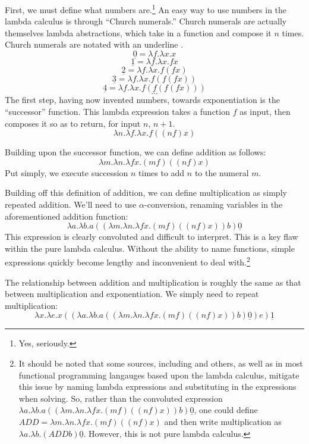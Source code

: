 \documentclass[twocolumn,titlepage,12pt]{article}
\begin{document}
First, we must define what numbers are.\footnote{Yes, seriously.} An easy way to use numbers in the lambda calculus is through ``Church numerals.'' Church numerals are actually themselves lambda abstractions, which take in a function and compose it $n$ times. Church numerals are notated with an underline \cite{cornelllc}.
$$\underline{0}=\lambda f.\lambda x.x$$
$$\underline{1}=\lambda f.\lambda x.fx$$
$$\underline{2}=\lambda f.\lambda x.f(fx)$$
$$\underline{3}=\lambda f.\lambda x.f(f(fx))$$
$$\underline{4}=\lambda f.\lambda x.f(f(f(fx)))$$
$$...$$
The first step, having now invented numbers, towards exponentiation is the ``successor'' function. This lambda expression takes a function $f$ as input, then composes it so as to return, for input $n$, $n+1$.
$$\lambda n.\lambda f.\lambda x.f((n f) x)$$

Building upon the successor function, we can define addition as follows:
$$\lambda m.\lambda n.\lambda fx.(m f) ((n f) x)$$
Put simply, we execute succession $n$ times to add $n$ to the numeral $m$.

Building off this definition of addition, we can define multiplication as simply repeated addition. We'll need to use $\alpha$-conversion, renaming variables in the aforementioned addition function:
$$\lambda a.\lambda b.a ((\lambda m.\lambda n.\lambda fx.(m f) ((n f) x)) b) \underline{0}$$
This expression is clearly convoluted and difficult to interpret. This is a key flaw within the pure lambda calculus. Without the ability to name functions, simple expressions quickly become lengthy and inconvenient to deal with.\footnote{It should be noted that some sources, including \cite{cornellc}\cite{rojastutorial} and others, as well as in most functional programming langauges based upon the lambda calculus, mitigate this issue by naming lambda expressions and substituting in the expressions when solving. So, rather than the convoluted expression $\lambda a.\lambda b.a ((\lambda m.\lambda n.\lambda fx.(m f) ((n f) x)) b) \underline{0}$, one could define $ADD=\lambda m.\lambda n.\lambda fx.(m f) ((n f) x)$ and then write multiplication as $\lambda a.\lambda b.(ADD b) \underline{0}$. However, this is not pure lambda calculus.}

The relationship between addition and multiplication is roughly the same as that between multiplication and exponentiation. We simply need to repeat multiplication:
$$\lambda x.\lambda e.x ((\lambda a.\lambda b.a ((\lambda m.\lambda n.\lambda fx.(m f) ((n f) x)) b) \underline{0}) e) \underline{1}$$
\end{document}
